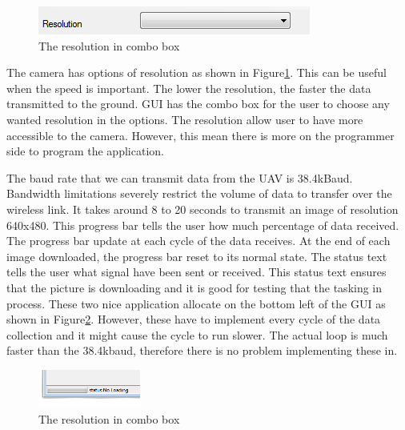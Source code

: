 \begin{figure}[H]
\begin{center}
\includegraphics[scale=0.5]{figures/resolutionOption.png} 
\end{center}
\caption{The resolution in combo box\label{resolutionOption}}
\end{figure}
The camera has options of resolution as shown in Figure\ref{resolutionOption}. This can be useful when the speed is important. The lower the resolution, the faster the data transmitted to the ground. GUI has the combo box for the user to choose any wanted resolution in the options. The resolution allow user to have more accessible to the camera. However, this mean there is more on the programmer side to program the application.


The baud rate that we can transmit data from the UAV is 38.4kBaud. Bandwidth limitations severely restrict the volume of data to transfer over the wireless link. It takes around 8 to 20 seconds to transmit an image of resolution 640x480. This progress bar tells the user how much percentage of data received. The progress bar update at each cycle of the data receives. At the end of each image downloaded, the progress bar reset to its normal state.  The status text tells the user what signal have been sent or received. This status text ensures that the picture is downloading and it is good for testing that the tasking in process. These two nice application allocate on the bottom left of the GUI as shown in Figure\ref{progressBar}. However, these have to implement every cycle of the data collection and it might cause the cycle to run slower. The actual loop is much faster than the 38.4kbaud, therefore there is no problem implementing these in.
\begin{figure}[H]
\begin{center}
\includegraphics[width=0.3\textwidth]{figures/progressBar.png} 
\end{center}
\caption{The resolution in combo box\label{progressBar}}
\end{figure}

